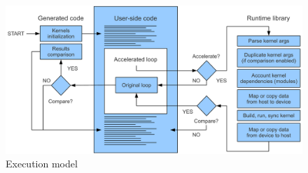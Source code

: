 \documentclass[a4,12pt]{article}
\begin{document}
\begin{figure}
\centering
\includegraphics[scale=0.4]{figures/execution.pdf}
\caption{Execution model}
\label{fig:execution}
\end{figure}
\end{document}
